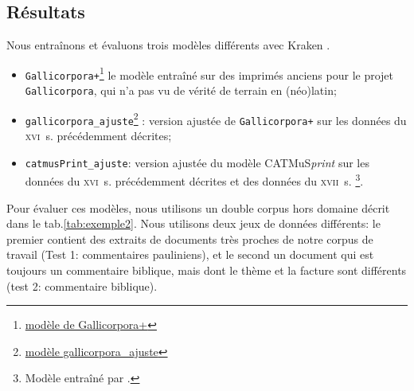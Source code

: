 \documentclass[11pt,french]{article}
\begin{document}
\subsection{Résultats}

Nous entraînons et évaluons trois modèles différents avec Kraken \citep{kraken}.

\begin{itemize}
    \item \texttt{Gallicorpora+}\footnote{\href{https://doi.org/10.5281/zenodo.7410529}{modèle de Gallicorpora+}} le modèle entraîné sur des imprimés anciens pour le projet \texttt{Gallicorpora}, qui n'a pas vu de vérité de terrain en (néo)latin;
    \item \texttt{gallicorpora\_ajuste}\footnote{\href{https://github.com/FourbeFlo/Lambertus/releases/download/model/Lambertus_03_best.mlmodel}{modèle gallicorpora\_ajuste}} : version ajustée de \texttt{Gallicorpora+} sur les données du \textsc{xvi}\ieme{}~s. précédemment décrites;
    \item \texttt{catmusPrint\_ajuste}: version ajustée du modèle CATMuS\textit{print} \citep{gabay:hal-04557457} sur les données du \textsc{xvi}\ieme{}~s. précédemment décrites et des données du \textsc{xvii}\ieme{}~s. \cite{gabay_2024_11526040}\footnote{Modèle entraîné par \citet{gabay_clerice_2024}.}.
\end{itemize}

Pour évaluer ces modèles, nous utilisons un double corpus hors domaine décrit dans le tab.\ref{tab:exemple2}. Nous utilisons deux jeux de données différents: le premier contient des extraits de documents très proches de notre corpus de travail (Test 1: commentaires pauliniens), et le second un document qui est toujours un commentaire biblique, mais dont le thème et la facture sont différents (test 2: commentaire biblique).
\end{document}
